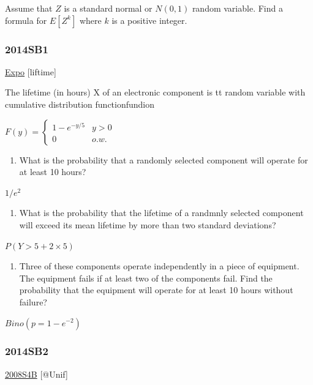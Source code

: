 \documentclass[10pt,twocolumn,portrait]{article}
\providecommand{\tightlist}{%
  \setlength{\itemsep}{0pt}\setlength{\parskip}{0pt}}
\begin{document}
Assume that \(Z\) is a standard normal or \(N(0,1)\) random variable.
Find a formula for \(E[Z^k]\) where \(k\) is a positive integer.

\hypertarget{sb1-2}{%
\subsubsection{2014SB1}\label{sb1-2}}

\protect\hyperlink{Expo}{Expo} {[}liftime{]}

The lifetime (in hours) X of an electronic component is tt random
variable with cumulative distribution functionfundion

\(F(y)=\begin{cases}1-e^{-y/5}& y>0\\0& o.w.\end{cases}\)

\begin{enumerate}
\def\labelenumi{(\alph{enumi})}
\tightlist
\item
  What is the probability that a randomly selected component will
  operate for at least 10 hours?
\end{enumerate}

\(1/e^2\)

\begin{enumerate}
\def\labelenumi{(\alph{enumi})}
\setcounter{enumi}{1}
\tightlist
\item
  What is the probability that the lifetime of a randmnly selected
  component will exceed its mean lifetime by more than two standard
  deviations?
\end{enumerate}

\(P(Y>5+2\times5)\)

\begin{enumerate}
\def\labelenumi{(\alph{enumi})}
\setcounter{enumi}{2}
\tightlist
\item
  Three of these components operate independently in a piece of
  equipment. The equipment fails if at least two of the components fail.
  Find the probability that the equipment will operate for at least 10
  hours without failure?
\end{enumerate}

\(Bino(p=1-e^{-2})\)

\hypertarget{sb2-2}{%
\subsubsection{2014SB2}\label{sb2-2}}

\protect\hyperlink{s4b}{2008S4B} {[}@Unif{]}
\end{document}

